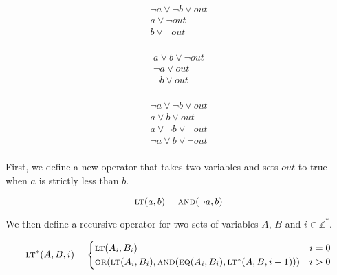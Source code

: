 \documentclass{article}
\begin{document}
\begin{multicols}{3}
  \begin{equation}
    \label{and}
    \begin{split}
      \neg{a} \lor \neg{b} \lor out \\
      a \lor \neg{out} \\
      b \lor \neg{out} \\
    \end{split}
  \end{equation}\break

  \begin{equation}
    \label{or}
    \begin{split}
      a \lor b \lor \neg{out} \\
      \neg{a} \lor out \\
      \neg{b} \lor out \\
    \end{split}
  \end{equation}\break

  \begin{equation}
    \label{eq}
    \begin{split}
      \neg{a} \lor \neg{b} \lor out \\
      a \lor b \lor out \\
      a \lor \neg{b} \lor \neg{out} \\
      \neg{a} \lor b \lor \neg{out} \\
    \end{split}
  \end{equation}\break
\end{multicols}

\noindent First, we define a new operator that takes two variables and sets
$out$ to true when $a$ is strictly less than $b$.

\begin{equation}
  \textsc{lt}(a, b) = \textsc{and}(\neg{a}, b)
\end{equation}\break

\noindent We then define a recursive operator for two sets of variables $A$,
$B$ and $i \in \mathbb{Z}^*$.

\begin{equation}
  \textsc{lt}^*(A, B, i) = \begin{cases}
    \textsc{lt}(A_i, B_i) & i = 0 \\
    \textsc{or}(\textsc{lt}(A_i, B_i), \textsc{and}(\textsc{eq}(A_i, B_i), \textsc{lt}^*(A, B, i - 1))) & i > 0
  \end{cases}
\end{equation}\break
\end{document}
